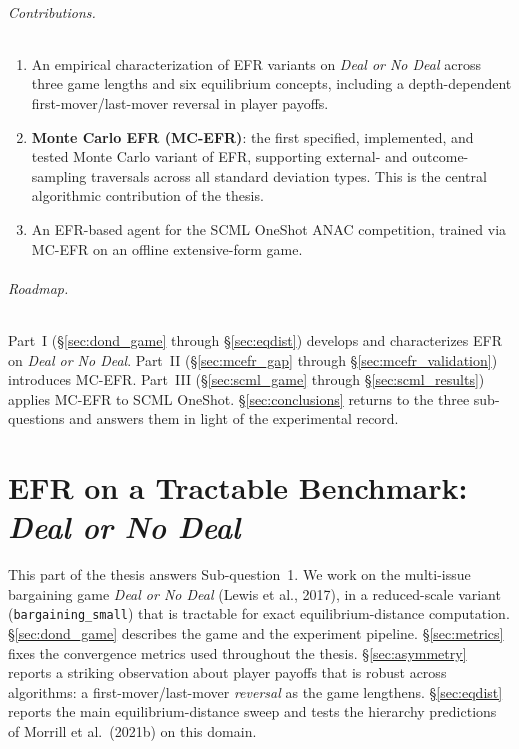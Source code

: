 \documentclass[11pt]{article}
\begin{document}
\paragraph{Contributions.}
\begin{enumerate}
    \item An empirical characterization of EFR variants on \emph{Deal or No Deal} across three game lengths and six equilibrium concepts, including a depth-dependent first-mover/last-mover reversal in player payoffs.
    \item \textbf{Monte Carlo EFR (MC-EFR)}: the first specified, implemented, and tested Monte Carlo variant of EFR, supporting external- and outcome-sampling traversals across all standard deviation types. This is the central algorithmic contribution of the thesis.
    \item An EFR-based agent for the SCML OneShot ANAC competition, trained via MC-EFR on an offline extensive-form game.
\end{enumerate}

\paragraph{Roadmap.} Part~I (\S\ref{sec:dond_game} through \S\ref{sec:eqdist}) develops and characterizes EFR on \emph{Deal or No Deal}. Part~II (\S\ref{sec:mcefr_gap} through \S\ref{sec:mcefr_validation}) introduces MC-EFR. Part~III (\S\ref{sec:scml_game} through \S\ref{sec:scml_results}) applies MC-EFR to SCML OneShot. \S\ref{sec:conclusions} returns to the three sub-questions and answers them in light of the experimental record.

\newpage

\part{EFR on a Tractable Benchmark: \emph{Deal or No Deal}}

This part of the thesis answers Sub-question~1. We work on the multi-issue bargaining game \emph{Deal or No Deal} (Lewis et al., 2017), in a reduced-scale variant (\texttt{bargaining\_small}) that is tractable for exact equilibrium-distance computation. \S\ref{sec:dond_game} describes the game and the experiment pipeline. \S\ref{sec:metrics} fixes the convergence metrics used throughout the thesis. \S\ref{sec:asymmetry} reports a striking observation about player payoffs that is robust across algorithms: a first-mover/last-mover \emph{reversal} as the game lengthens. \S\ref{sec:eqdist} reports the main equilibrium-distance sweep and tests the hierarchy predictions of Morrill et al.\ (2021b) on this domain.
\end{document}
